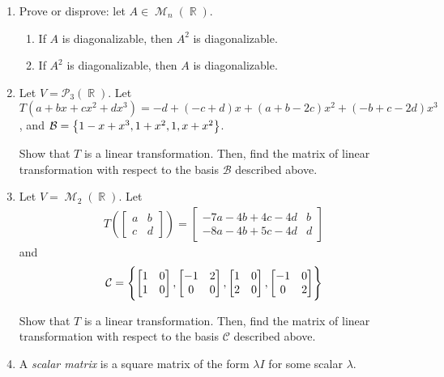 \documentclass{amsart} %
\theoremstyle{mytheoremstyle}
\theoremstyle{definition}
\DeclareMathOperator{\R}{\mathbb{R}}
\DeclareMathOperator{\1}{\mathbbm{1}}
\DeclareMathOperator{\MM}{\mathcal{M}}
\newcommand{\polyn}[2]{\mathcal{P}_{#1}(#2)}
\begin{document}
\begin{enumerate}[itemsep=1em]
	\item Prove or disprove: let $A \in \MM_{n}(\R)$.
	\begin{enumerate}
		\item If $A$ is diagonalizable, then $A^2$ is diagonalizable.
		\item If $A^2$ is diagonalizable, then $A$ is diagonalizable.
	\end{enumerate}

	\item Let $V = \polyn{3}{\R}$. Let $T(a+bx+cx^2+dx^3) = -d + (-c+d)x + (a+b-2c)x^2 + (-b+c-2d)x^3$, and $\mathcal{B} = \set{1-x+x^3, 1+x^2, 1, x+x^2}$.

	Show that $T$ is a linear transformation. Then, find the matrix of linear transformation with respect to the basis $\mathcal{B}$ described above.
	
	
	\item Let $V = \MM_2(\R)$. Let
	\begin{align*}
	T \left( \begin{bmatrix}
	a & b \\ c & d
	\end{bmatrix} \right) = \begin{bmatrix}
	-7a - 4b + 4c - 4d & b \\ -8a -4b + 5c -4d & d
	\end{bmatrix}
	\end{align*}
	and
	\begin{align*}
	\mathcal{C} = \set{ \begin{bmatrix}
		1 & 0 \\ 1 & 0
		\end{bmatrix}, \begin{bmatrix}
		-1 & 2 \\ 0 & 0
		\end{bmatrix}, \begin{bmatrix}
		1 & 0 \\ 2 & 0
		\end{bmatrix}, \begin{bmatrix}
		-1 & 0 \\ 0 & 2
		\end{bmatrix} }
	\end{align*}
	
	Show that $T$ is a linear transformation. Then, find the matrix of linear transformation with respect to the basis $\mathcal{C}$ described above.


	\item A \textit{scalar matrix} is a square matrix of the form $\lambda I$ for some scalar $\lambda$.
	

\end{enumerate}
\end{document}
